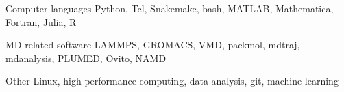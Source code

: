 
\begin{cvskills}
  
  \cvskill
    {Computer languages} %
    {Python, Tcl, Snakemake, bash, MATLAB, Mathematica, Fortran, Julia, R} %

  \cvskill
    {MD related software} %
    {LAMMPS, GROMACS, VMD, packmol, mdtraj, mdanalysis, PLUMED, Ovito, NAMD} %
  
  \cvskill
    {Other} %
    {Linux, high performance computing, data analysis, git, machine learning} %
    
\end{cvskills}
